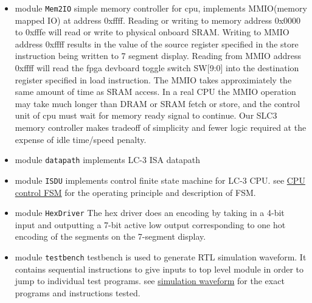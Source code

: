 \documentclass[a4paper,12pt]{report}
\begin{document}
\begin{itemize}
    \item module \verb*|Mem2IO| \label{sec: memcontroller}
    \subitem simple memory controller for cpu, implements MMIO(memory mapped IO) at address 0xffff. Reading or writing to memory address 0x0000 to 0xfffe will read or write to physical onboard SRAM. Writing to MMIO address 0xffff results in the value of the source register specified in the store instruction being written to 7 segment display. Reading from MMIO address 0xffff will read the fpga devboard toggle switch SW[9:0] into the destination register specified in load instruction. The MMIO takes approximiately the same amount of time as SRAM access. In a real CPU the MMIO operation may take much longer than DRAM or SRAM fetch or store, and the control unit of cpu must wait for memory ready signal to continue. Our SLC3 memory controller makes tradeoff of simplicity and fewer logic required at the expense of idle time/speed penalty. 
    \item module \verb*|datapath|
    \subitem  implements LC-3 ISA datapath
    \item module \verb*|ISDU|
    \subitem  implements control finite state machine for LC-3 CPU. see \hyperref[sec: fsm]{CPU control FSM} for the operating principle and description of FSM. 
    \item module \verb*|HexDriver|
    \subitem The hex driver does an encoding by taking in a 4-bit input and outputting a 7-bit active low output corresponding to one hot encoding of the segments on the 7-segment display. 
    \item module \verb*|testbench|
    \subitem testbench is used to generate RTL simulation waveform. It contains sequential instructions to give inputs to top level module in order to jump to individual test programs. see \hyperref[sec: simulation waveform]{simulation waveform} for the exact programs and instructions tested. 
\end{itemize}
\pagebreak
\end{document}
